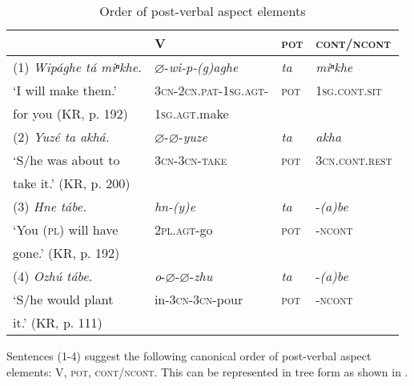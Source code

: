 \documentclass[output=paper]{LSP/langsci}
\begin{document}
\begin{table}
\caption{Order of post-verbal aspect elements} \label{order}
\begin{tabular}[h!]{ l l l l }
\lsptoprule
& V& \textsc{pot} & \textsc{cont/ncont} \\
\midrule 
(1)	\textit{Wip\'aghe t\'a miⁿkhe.} & $\varnothing$-\textit{wi-p-(g)aghe}  & \textit{ta} & \textit{miⁿkhe} \\
\hspace{2em} `I will make them.'  & \textsc{3cn-2cn.pat-1sg.agt-}  & \textsc{pot} & \textsc{1sg.cont.sit} \\
\hspace{2em}for you (KR, p. 192) & \hspace{2em}\textsc{1sg.agt}.make & & \\

(2)	\textit{Yuz\'e ta akh\'a.}	 & $\varnothing$-$\varnothing$-\textit{yuze}  & \textit{ta} & \textit{akha} \\
\hspace{2em}`S/he was about to & \textsc{3cn-3cn-take} & \textsc{pot}	& \textsc{3cn.cont.rest} \\
\hspace{2em} take it.' (KR, p. 200)  & & & \\

(3)	\textit{Hne t\'abe.}	& \textit{hn-(y)e} 	& \textit{ta}	& -\textit{(a)be} \\
\hspace{2em}`You (\textsc{pl}) will have  & \textsc{2pl.agt}-go & \textsc{pot} & \textsc{-ncont} \\
\hspace{2em} gone.' (KR, p. 192) & & & \\

(4) \textit{Ozh\'u t\'abe.}	& \textit{o}-$\varnothing$-$\varnothing$-\textit{zhu} 	& \textit{ta}	& -\textit{(a)be} \\
\hspace{2em}`S/he would plant   &	in-\textsc{3cn-3cn}-pour &	\textsc{pot} & \textsc{-ncont} \\
\hspace{2em} it.' (KR, p. 111) & & & \\
\hline \hline
\end{tabular}
\end{table}

Sentences (1-4) suggest the following canonical order of post-verbal aspect elements: V, \textsc{pot}, \textsc{cont/ncont}. This can be represented in tree form as shown in .
\end{document}
